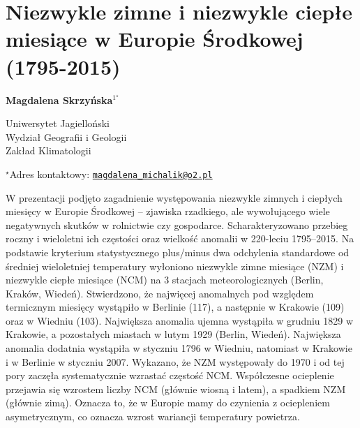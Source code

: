 \documentclass[\main/boa.tex]{subfiles}
\begin{document}
\section{Niezwykle zimne i niezwykle ciepłe miesiące w Europie Środkowej \mbox{(1795-2015)}}

\begin{center}
  {\bf {} Magdalena Skrzyńska$^{1^\star}$}
\end{center}

\vskip 0.3cm

\begin{affiliations}
\begin{enumerate}
\begin{minipage}{0.915\textwidth}
\centering
\item Uniwersytet Jagielloński\\ Wydział Geografii i Geologii\\ Zakład Klimatologii\\[-2pt]
\end{minipage}
\end{enumerate}
$^\star$Adres kontaktowy: \href{mailto:magdalena_michalik@o2.pl}{\nolinkurl{magdalena_michalik@o2.pl}}\\
\end{affiliations}

\vskip 0.5cm


\vskip 0.5cm

W prezentacji podjęto zagadnienie występowania niezwykle zimnych i ciepłych miesięcy w Europie Środkowej -- zjawiska rzadkiego, ale wywołującego wiele negatywnych skutków w rolnictwie czy gospodarce. Scharakteryzowano przebieg roczny i wieloletni ich częstości oraz wielkość anomalii w 220-leciu \mbox{1795--2015}.  Na podstawie kryterium statystycznego plus/minus dwa odchylenia standardowe od średniej wieloletniej temperatury wyłoniono niezwykle zimne miesiące (NZM) i niezwykle ciepłe miesiące (NCM) na 3 stacjach meteorologicznych (Berlin, Kraków, Wiedeń). Stwierdzono, że najwięcej anomalnych pod względem termicznym miesięcy wystąpiło w Berlinie (117), a następnie w Krakowie (109) oraz w Wiedniu (103).  Największa anomalia ujemna wystąpiła w grudniu 1829  w Krakowie, a pozostałych miastach w lutym 1929 (Berlin, Wiedeń). Największa anomalia dodatnia wystąpiła w styczniu 1796  w Wiedniu, natomiast w Krakowie i w Berlinie  w styczniu 2007. Wykazano, że NZM występowały do 1970 i od tej pory zaczęła systematycznie wzrastać częstość NCM. Współczesne ocieplenie przejawia się wzrostem liczby NCM (głównie wiosną i latem), a spadkiem NZM (głównie zimą). Oznacza to, że w Europie mamy do czynienia z ociepleniem asymetrycznym, co oznacza wzrost wariancji temperatury powietrza. 
\end{document}
